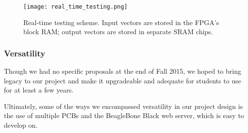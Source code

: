 \begin{figure}
\texttt{[image: real\_time\_testing.png]}
\caption{Real-time testing scheme. Input vectors are stored in the FPGA's block RAM; output vectors are stored in separate SRAM chips.}
\label{fig:real_time_testing}
\end{figure}

\subsubsection{Versatility}
Though we had no specific proposals at the end of Fall 2015, we hoped to bring legacy to our project and make it upgradeable and adequate for students to use for at least a few years.

Ultimately, some of the ways we encompassed versatility in our project design is the use of multiple PCBs and the BeagleBone Black web server, which is easy to develop on.

\newpage